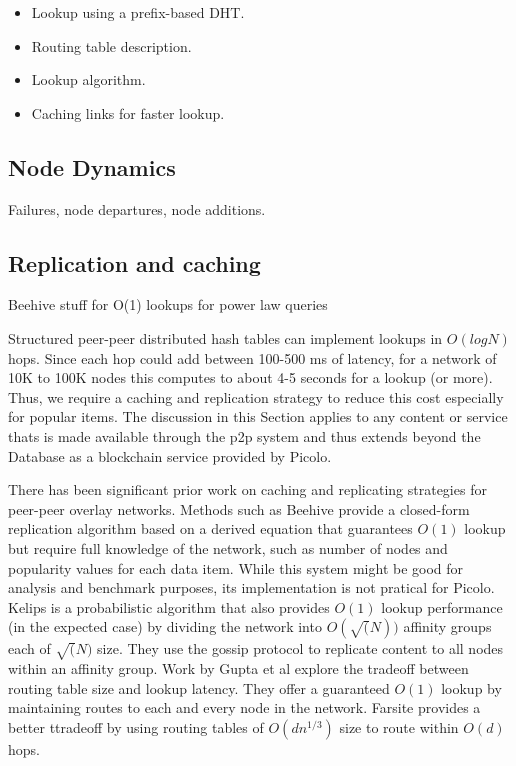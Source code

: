 \begin{itemize}
    \item Lookup using a prefix-based DHT. 
    \item Routing table description.
    \item Lookup algorithm.
    \item Caching links for faster lookup. 
\end{itemize}

\subsection{Node Dynamics}
\label{net:node_dynamics}

Failures, node departures, node additions.

\subsection{Replication and caching}
\label{net:replication}
Beehive stuff for O(1) lookups for power law queries

Structured peer-peer distributed hash tables can implement lookups in \( O(log N)\) hops. Since each hop could add between 100-500
ms of latency, for a network of 10K to 100K nodes this computes to about 4-5 seconds for a lookup (or more). Thus, we
require a caching and replication strategy to reduce this cost especially for popular items. The discussion in this
Section applies to any content or service thats is made available through the p2p system and thus extends beyond the
Database as a blockchain service provided by Picolo.

There has been significant prior work on caching and replicating strategies for peer-peer overlay networks. Methods such
as Beehive \cite{beehive} provide a closed-form replication algorithm based on a derived equation that guarantees
\(O(1)\) lookup but require full knowledge of the network, such as number of nodes and popularity values for each data
item. While this system might be good for analysis and benchmark purposes, its implementation is not pratical for
Picolo. Kelips \cite{kelips} is a probabilistic algorithm that also provides \(O(1)\) lookup performance (in the
expected case) by dividing the network into \(O(\sqrt(N))\) affinity groups each of \(\sqrt(N)\) size. They use the
gossip protocol to replicate content to all nodes within an affinity group. Work by Gupta et al \cite{one_hop_lookup}
explore the tradeoff between routing table size and lookup latency. They offer a guaranteed \(O(1)\) lookup by
maintaining routes to each and every node in the network. Farsite \cite{farsite} provides a better ttradeoff by using
routing tables of \(O(dn^{1/3})\) size to route within \(O(d)\) hops.


